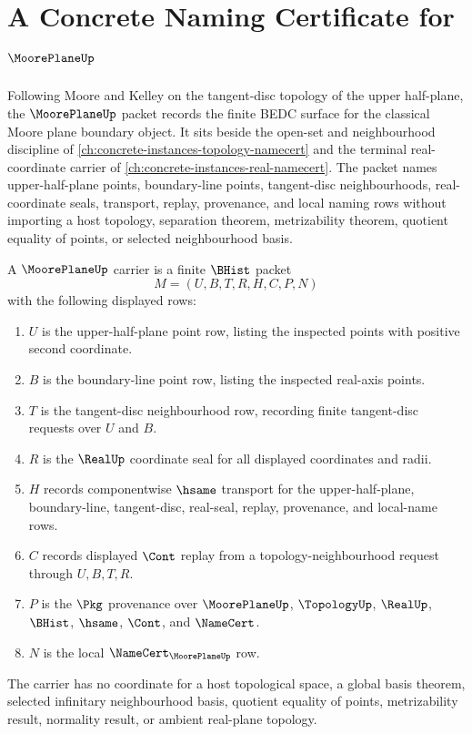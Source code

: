 \chapter{A Concrete Naming Certificate for $\MoorePlaneUp$}
\label{ch:concrete-instances-moore-plane-namecert}

Following Moore and Kelley on the tangent-disc topology of the upper half-plane, the $\MoorePlaneUp$ packet records the finite BEDC surface for the classical Moore plane boundary object. It sits beside the open-set and neighbourhood discipline of \autoref{ch:concrete-instances-topology-namecert} and the terminal real-coordinate carrier of \autoref{ch:concrete-instances-real-namecert}. The packet names upper-half-plane points, boundary-line points, tangent-disc neighbourhoods, real-coordinate seals, transport, replay, provenance, and local naming rows without importing a host topology, separation theorem, metrizability theorem, quotient equality of points, or selected neighbourhood basis.

\begin{definition}
\label{def:moore-plane-carrier}
A $\MoorePlaneUp$ carrier is a finite $\BHist$ packet
$$
M=(U,B,T,R,H,C,P,N)
$$
with the following displayed rows:
\begin{enumerate}
\item $U$ is the upper-half-plane point row, listing the inspected points with positive second coordinate.
\item $B$ is the boundary-line point row, listing the inspected real-axis points.
\item $T$ is the tangent-disc neighbourhood row, recording finite tangent-disc requests over $U$ and $B$.
\item $R$ is the $\RealUp$ coordinate seal for all displayed coordinates and radii.
\item $H$ records componentwise $\hsame$ transport for the upper-half-plane, boundary-line, tangent-disc, real-seal, replay, provenance, and local-name rows.
\item $C$ records displayed $\Cont$ replay from a topology-neighbourhood request through $U,B,T,R$.
\item $P$ is the $\Pkg$ provenance over $\MoorePlaneUp$, $\TopologyUp$, $\RealUp$, $\BHist$, $\hsame$, $\Cont$, and $\NameCert$.
\item $N$ is the local $\NameCert_{\MoorePlaneUp}$ row.
\end{enumerate}
The carrier has no coordinate for a host topological space, a global basis theorem, selected infinitary neighbourhood basis, quotient equality of points, metrizability result, normality result, or ambient real-plane topology.
\end{definition}

